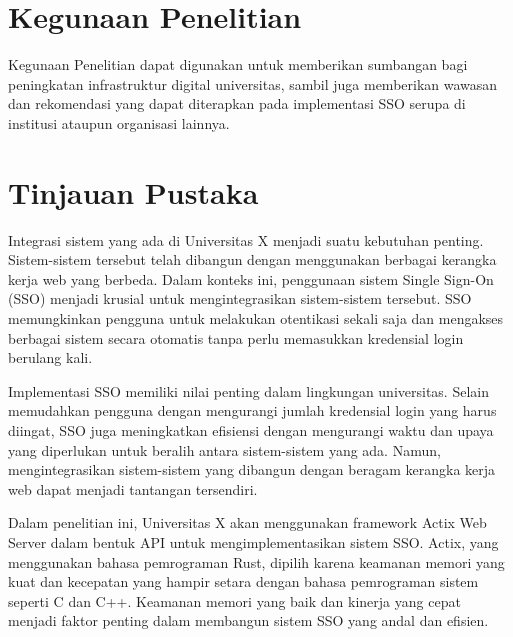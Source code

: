 \documentclass[12pt]{article}
\begin{document}
\section{Kegunaan Penelitian}
Kegunaan Penelitian dapat digunakan untuk  memberikan sumbangan bagi peningkatan infrastruktur digital universitas, sambil juga memberikan wawasan dan rekomendasi yang dapat diterapkan pada implementasi SSO serupa di institusi ataupun organisasi lainnya.

\section{Tinjauan Pustaka}
Integrasi sistem yang ada di Universitas X menjadi suatu kebutuhan penting. Sistem-sistem tersebut telah dibangun dengan menggunakan berbagai kerangka kerja web yang berbeda. Dalam konteks ini, penggunaan sistem Single Sign-On (SSO) menjadi krusial untuk mengintegrasikan sistem-sistem tersebut. SSO memungkinkan pengguna untuk melakukan otentikasi sekali saja dan mengakses berbagai sistem secara otomatis tanpa perlu memasukkan kredensial login berulang kali\autocite{ComparativeAnaWaluyo2022}.

Implementasi SSO memiliki nilai penting dalam lingkungan universitas. Selain memudahkan pengguna dengan mengurangi jumlah kredensial login yang harus diingat, SSO juga meningkatkan efisiensi dengan mengurangi waktu dan upaya yang diperlukan untuk beralih antara sistem-sistem yang ada. Namun, mengintegrasikan sistem-sistem yang dibangun dengan beragam kerangka kerja web dapat menjadi tantangan tersendiri.

Dalam penelitian ini, Universitas X akan menggunakan framework Actix Web Server dalam bentuk API untuk mengimplementasikan sistem SSO. Actix, yang menggunakan bahasa pemrograman Rust, dipilih karena keamanan memori yang kuat dan kecepatan yang hampir setara dengan bahasa pemrograman sistem seperti C dan C++. Keamanan memori yang baik dan kinerja yang cepat menjadi faktor penting dalam membangun sistem SSO yang andal dan efisien\autocite{kyriakou2022complementing}.
\end{document}
